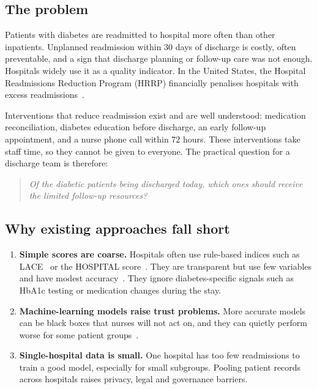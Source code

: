 \documentclass[10pt,a4paper]{article}
\begin{document}
\subsection{The problem}\label{sec:1.1}

Patients with diabetes are readmitted to hospital more often than other inpatients. Unplanned readmission within 30 days of discharge is costly, often preventable, and a sign that discharge planning or follow-up care was not enough. Hospitals widely use it as a quality indicator. In the United States, the Hospital Readmissions Reduction Program (HRRP) financially penalises hospitals with excess readmissions~\cite{cms-hrrp}.

Interventions that reduce readmission exist and are well understood: medication reconciliation, diabetes education before discharge, an early follow-up appointment, and a nurse phone call within 72 hours. These interventions take staff time, so they cannot be given to everyone. The practical question for a discharge team is therefore:
\begin{quote}\emph{Of the diabetic patients being discharged today, which ones should receive the limited follow-up resources?}\end{quote}

\subsection{Why existing approaches fall short}\label{sec:1.2}
\begin{enumerate}
\item \textbf{Simple scores are coarse.} Hospitals often use rule-based indices such as LACE~\cite{vanwalraven2010} or the HOSPITAL score~\cite{donze2013}. They are transparent but use few variables and have modest accuracy~\cite{kansagara2011}. They ignore diabetes-specific signals such as HbA1c testing or medication changes during the stay.
\item \textbf{Machine-learning models raise trust problems.} More accurate models can be black boxes that nurses will not act on, and they can quietly perform worse for some patient groups~\cite{obermeyer2019,rajkomar2018}.
\item \textbf{Single-hospital data is small.} One hospital has too few readmissions to train a good model, especially for small subgroups. Pooling patient records across hospitals raises privacy, legal and governance barriers.
\end{enumerate}
\end{document}
